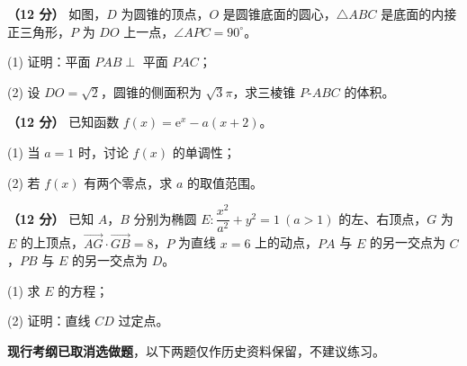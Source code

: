 \begin{question}
\textbf{（12 分）} 如图，$D$ 为圆锥的顶点，$O$ 是圆锥底面的圆心，$\triangle ABC$ 是底面的内接正三角形，$P$ 为 $DO$ 上一点，$\angle APC=90^\circ$。
\nopagebreak[4]
\begin{center}\end{center}
\nopagebreak[4]
  (1) 证明：平面 $PAB\perp$ 平面 $PAC$；

  (2) 设 $DO=\sqrt2$，圆锥的侧面积为 $\sqrt3\pi$，求三棱锥 $P\text{-}ABC$ 的体积。

\end{question}
\begin{question}
\textbf{（12 分）} 已知函数 $f(x)=\mathrm e^{x}-a(x+2)$。

  (1) 当 $a=1$ 时，讨论 $f(x)$ 的单调性；

  (2) 若 $f(x)$ 有两个零点，求 $a$ 的取值范围。

\end{question}
\begin{question}
\textbf{（12 分）} 已知 $A$，$B$ 分别为椭圆 $E:\dfrac{x^{2}}{a^{2}}+y^{2}=1\ (a>1)$ 的左、右顶点，$G$ 为 $E$ 的上顶点，$\overrightarrow{AG}\cdot\overrightarrow{GB}=8$，$P$ 为直线 $x=6$ 上的动点，$PA$ 与 $E$ 的另一交点为 $C$，$PB$ 与 $E$ 的另一交点为 $D$。

  (1) 求 $E$ 的方程；

  (2) 证明：直线 $CD$ 过定点。

\par\medskip

\end{question}

\begin{gktip}
\textbf{ 现行考纲已取消选做题}，以下两题仅作历史资料保留，不建议练习。
\end{gktip}

\enlargethispage{4\baselineskip}

